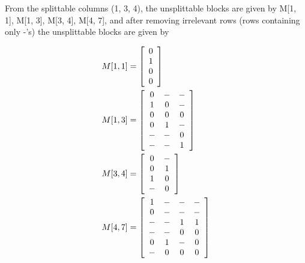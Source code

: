 \documentclass[10pt,a4paer,twocolumn]{article}
\begin{document}
From the splittable columns (1, 3, 4), the unsplittable blocks are given by M[1, 1], M[1, 3], M[3, 4], M[4,
7], and after removing irrelevant rows (rows containing only -'s) the unsplittable blocks are given by

\begin{align*}
        M[1,1] &= \left[ \begin{array}{c}
                0                       \\ 
                1                       \\ 
                0                       \\ 
                0 
        \end{array} \right]             \\
        M[1,3] &= \left[ \begin{array}{c c c}
                0       & -     & -     \\
                1       & 0     & -     \\
                0       & 0     & 0     \\
                0       & 1     & -     \\
                -       & -     & 0     \\
                -       & -     & 1 
        \end{array} \right]             \\
        M[3,4] &= \left[ \begin{array}{c c}
                0       & -             \\
                0       & 1             \\
                1       & 0             \\
                -       & 0
        \end{array} \right]             \\
        M[4,7] &= \left[ \begin{array}{c c c c}
        1       & -     & -     & -     \\
        0       & -     & -     & -     \\
        -       & -     & 1     & 1     \\
        -       & -     & 0     & 0     \\
        0       & 1     & -     & 0     \\
        -       & 0     & 0     & 0     
        \end{array} \right]
\end{align*}
\end{document}
